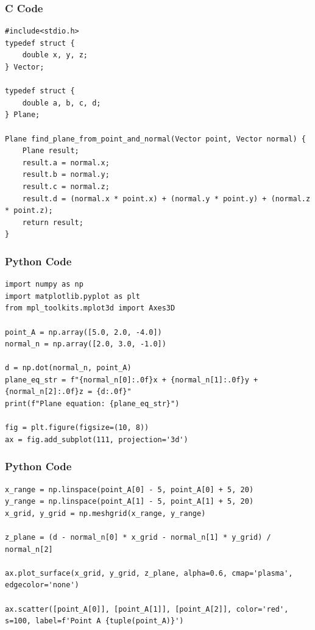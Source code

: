 \documentclass{beamer}
\begin{document}
\begin{frame}[fragile]
    \frametitle{C Code}

    \begin{lstlisting}
#include<stdio.h>
typedef struct {
    double x, y, z;
} Vector;

typedef struct {
    double a, b, c, d;
} Plane;

Plane find_plane_from_point_and_normal(Vector point, Vector normal) {
    Plane result;
    result.a = normal.x;
    result.b = normal.y;
    result.c = normal.z;
    result.d = (normal.x * point.x) + (normal.y * point.y) + (normal.z * point.z);
    return result;
}
    \end{lstlisting}
\end{frame}


\begin{frame}[fragile]
    \frametitle{Python Code}
    \begin{lstlisting}
import numpy as np
import matplotlib.pyplot as plt
from mpl_toolkits.mplot3d import Axes3D

point_A = np.array([5.0, 2.0, -4.0])
normal_n = np.array([2.0, 3.0, -1.0])

d = np.dot(normal_n, point_A)
plane_eq_str = f"{normal_n[0]:.0f}x + {normal_n[1]:.0f}y + {normal_n[2]:.0f}z = {d:.0f}"
print(f"Plane equation: {plane_eq_str}")

fig = plt.figure(figsize=(10, 8))
ax = fig.add_subplot(111, projection='3d')
    \end{lstlisting}
\end{frame}

\begin{frame}[fragile]
    \frametitle{Python Code}
    \begin{lstlisting}
x_range = np.linspace(point_A[0] - 5, point_A[0] + 5, 20)
y_range = np.linspace(point_A[1] - 5, point_A[1] + 5, 20)
x_grid, y_grid = np.meshgrid(x_range, y_range)

z_plane = (d - normal_n[0] * x_grid - normal_n[1] * y_grid) / normal_n[2]

ax.plot_surface(x_grid, y_grid, z_plane, alpha=0.6, cmap='plasma', edgecolor='none')

ax.scatter([point_A[0]], [point_A[1]], [point_A[2]], color='red', s=100, label=f'Point A {tuple(point_A)}')

   
    \end{lstlisting}
\end{frame}
\end{document}

